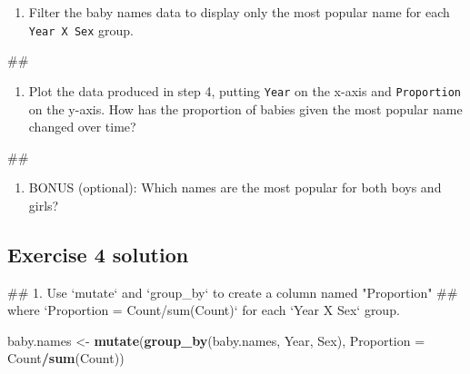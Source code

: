 \documentclass[]{book}
\newenvironment{Shaded}{\begin{snugshade}}{\end{snugshade}}
\newcommand{\KeywordTok}[1]{\textcolor[rgb]{0.13,0.29,0.53}{\textbf{#1}}}
\newcommand{\DataTypeTok}[1]{\textcolor[rgb]{0.13,0.29,0.53}{#1}}
\newcommand{\StringTok}[1]{\textcolor[rgb]{0.31,0.60,0.02}{#1}}
\newcommand{\OperatorTok}[1]{\textcolor[rgb]{0.81,0.36,0.00}{\textbf{#1}}}
\newcommand{\NormalTok}[1]{#1}
\providecommand{\tightlist}{%
  \setlength{\itemsep}{0pt}\setlength{\parskip}{0pt}}
\begin{document}
\begin{enumerate}
\def\labelenumi{\arabic{enumi}.}
\setcounter{enumi}{2}
\tightlist
\item
  Filter the baby names data to display only the most popular name for
  each \texttt{Year\ X\ Sex} group.
\end{enumerate}

\begin{Shaded}
\begin{Highlighting}[]
\NormalTok{##}
\end{Highlighting}
\end{Shaded}

\begin{enumerate}
\def\labelenumi{\arabic{enumi}.}
\setcounter{enumi}{3}
\tightlist
\item
  Plot the data produced in step 4, putting \texttt{Year} on the x-axis
  and \texttt{Proportion} on the y-axis. How has the proportion of
  babies given the most popular name changed over time?
\end{enumerate}

\begin{Shaded}
\begin{Highlighting}[]
\NormalTok{##}
\end{Highlighting}
\end{Shaded}

\begin{enumerate}
\def\labelenumi{\arabic{enumi}.}
\setcounter{enumi}{4}
\tightlist
\item
  BONUS (optional): Which names are the most popular for both boys and
  girls?
\end{enumerate}

\subsection{Exercise 4 solution}\label{exercise-4-solution}

\begin{Shaded}
\begin{Highlighting}[]
\NormalTok{## 1.  Use `mutate` and `group_by` to create a column named "Proportion"}
\NormalTok{##     where `Proportion = Count/sum(Count)` for each `Year X Sex` group.}
\end{Highlighting}
\end{Shaded}

\begin{Shaded}
\begin{Highlighting}[]
\NormalTok{baby.names <-}\StringTok{ }\KeywordTok{mutate}\NormalTok{(}\KeywordTok{group_by}\NormalTok{(baby.names, Year, Sex),}
                     \DataTypeTok{Proportion =}\NormalTok{ Count}\OperatorTok{/}\KeywordTok{sum}\NormalTok{(Count))}
\end{Highlighting}
\end{Shaded}
\end{document}
